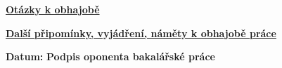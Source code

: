 \documentclass[a4paper,12pt]{article}
\begin{document}
\vskip15pt
\uline{\textbf{Otázky k obhajobě}}
\vskip36pt

\uline{\textbf{Další připomínky, vyjádření, náměty k obhajobě práce}}
\vskip45pt

\textbf{Datum:}
\vskip10pt
\hfill \textbf{Podpis oponenta bakalářské práce}

    
\end{document}
